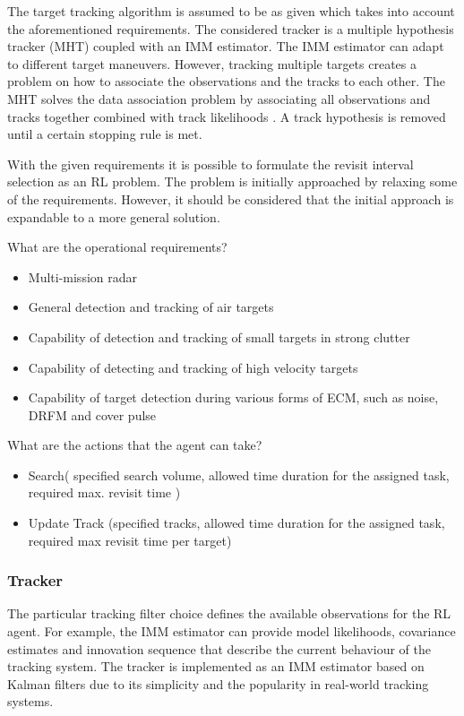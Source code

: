 \documentclass[english, 12pt, a4paper, elec, utf8, a-1b, online]{aaltothesis}
\begin{document}
The target tracking algorithm is assumed to be as given which takes into account the aforementioned requirements. 
The considered tracker is a multiple hypothesis tracker (MHT) coupled with an IMM estimator. 
The IMM estimator can adapt to different target maneuvers. 
However, tracking multiple targets creates a problem on how to associate the observations and the tracks to each other. 
The MHT solves the data association problem by associating all observations and tracks together combined with track likelihoods \cite{Blackman2004}. 
A track hypothesis is removed until a certain stopping rule is met. 

With the given requirements it is possible to formulate the revisit interval selection as an RL problem. The problem is initially approached by relaxing some of the requirements. However, it should be considered that the initial approach is expandable to a more general solution. 


What are the operational requirements?

\begin{itemize}
    \item Multi-mission radar
    \item General detection and tracking of air targets
    \item Capability of detection and tracking of small targets in strong clutter
    \item Capability of detecting and tracking of high velocity targets
    \item Capability of target detection during various forms of ECM, such as noise, DRFM and cover pulse
\end{itemize}

What are the actions that the agent can take?

\begin{itemize}
    \item Search( specified search volume, allowed time duration for the assigned task, required max. revisit time )
    \item Update Track (specified tracks, allowed time duration for the assigned task, required max revisit time per target)
\end{itemize}



\subsubsection{Tracker}

The particular tracking filter choice defines the available observations for the RL agent.
For example, the IMM estimator can provide model likelihoods, covariance estimates and innovation sequence that describe the current behaviour of the tracking system.
The tracker is implemented as an IMM estimator based on Kalman filters due to its simplicity and the popularity in real-world tracking systems.
\end{document}
